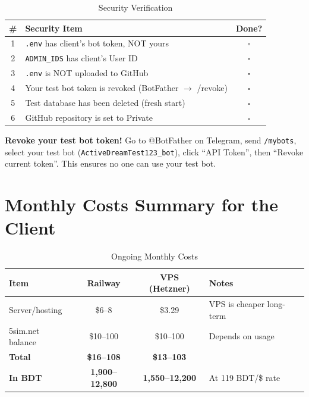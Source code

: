 \begin{table}[H]
\centering
\caption{Security Verification}
\begin{tabularx}{\textwidth}{|c|X|c|}
\hline
\textbf{\#} & \textbf{Security Item} & \textbf{Done?} \\
\hline
1 & \texttt{.env} has client's bot token, NOT yours & $\square$ \\
\hline
2 & \texttt{ADMIN\_IDS} has client's User ID & $\square$ \\
\hline
3 & \texttt{.env} is NOT uploaded to GitHub & $\square$ \\
\hline
4 & Your test bot token is revoked (BotFather $\rightarrow$ /revoke) & $\square$ \\
\hline
5 & Test database has been deleted (fresh start) & $\square$ \\
\hline
6 & GitHub repository is set to Private & $\square$ \\
\hline
\end{tabularx}
\end{table}

\begin{importantbox}
\textbf{Revoke your test bot token!} Go to @BotFather on Telegram, send \texttt{/mybots}, select your test bot (\texttt{ActiveDreamTest123\_bot}), click ``API Token'', then ``Revoke current token''. This ensures no one can use your test bot.
\end{importantbox}

\section{Monthly Costs Summary for the Client}

\begin{table}[H]
\centering
\caption{Ongoing Monthly Costs}
\begin{tabularx}{\textwidth}{|l|c|c|X|}
\hline
\textbf{Item} & \textbf{Railway} & \textbf{VPS (Hetzner)} & \textbf{Notes} \\
\hline
Server/hosting & \$6--8 & \$3.29 & VPS is cheaper long-term \\
\hline
5sim.net balance & \$10--100 & \$10--100 & Depends on usage \\
\hline
\textbf{Total} & \textbf{\$16--108} & \textbf{\$13--103} & \\
\hline
\textbf{In BDT} & \textbf{1,900--12,800} & \textbf{1,550--12,200} & At 119 BDT/\$ rate \\
\hline
\end{tabularx}
\end{table}

